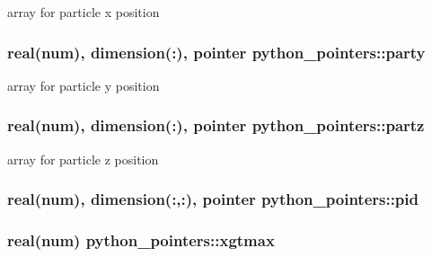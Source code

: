 array for particle x position 

\subsubsection[{\texorpdfstring{party}{party}}]{\setlength{\rightskip}{0pt plus 5cm}real(num), dimension(\+:), pointer python\+\_\+pointers\+::party}\hypertarget{namespacepython__pointers_a7ed293531cd47aefba8bd76e2692c30d}{}\label{namespacepython__pointers_a7ed293531cd47aefba8bd76e2692c30d}


array for particle y position 

\subsubsection[{\texorpdfstring{partz}{partz}}]{\setlength{\rightskip}{0pt plus 5cm}real(num), dimension(\+:), pointer python\+\_\+pointers\+::partz}\hypertarget{namespacepython__pointers_a318b3d65ffe6c40b81bae433e093df16}{}\label{namespacepython__pointers_a318b3d65ffe6c40b81bae433e093df16}


array for particle z position 

\subsubsection[{\texorpdfstring{pid}{pid}}]{\setlength{\rightskip}{0pt plus 5cm}real(num), dimension(\+:,\+:), pointer python\+\_\+pointers\+::pid}\hypertarget{namespacepython__pointers_a8a754456a1a3440c897f9a6249782713}{}\label{namespacepython__pointers_a8a754456a1a3440c897f9a6249782713}
\subsubsection[{\texorpdfstring{xgtmax}{xgtmax}}]{\setlength{\rightskip}{0pt plus 5cm}real(num) python\+\_\+pointers\+::xgtmax}\hypertarget{namespacepython__pointers_ae4ae1714533add4e893ccdb25fb89854}{}\label{namespacepython__pointers_ae4ae1714533add4e893ccdb25fb89854}
